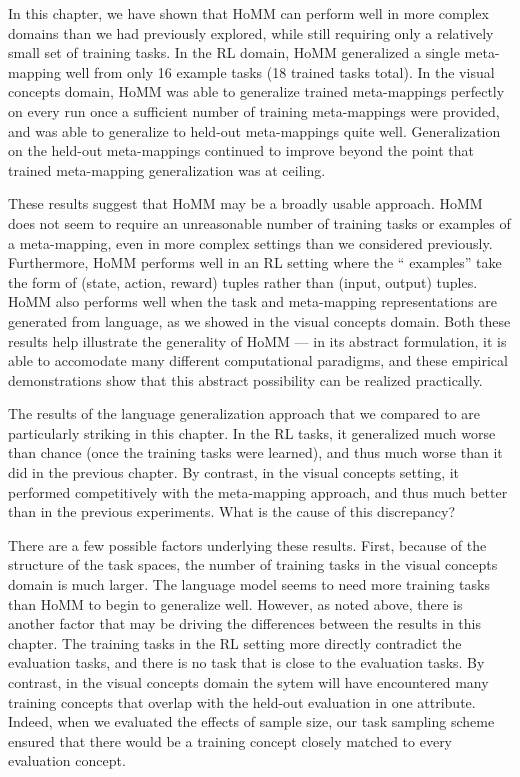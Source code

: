 In this chapter, we have shown that HoMM can perform well in more complex domains than we had previously explored, while still requiring only a relatively small set of training tasks. In the RL domain, HoMM generalized a single meta-mapping well from only 16 example tasks (18 trained tasks total). In the visual concepts domain, HoMM was able to generalize trained meta-mappings perfectly on every run once a sufficient number of training meta-mappings were provided, and was able to generalize to held-out meta-mappings quite well. Generalization on the held-out meta-mappings continued to improve beyond the point that trained meta-mapping generalization was at ceiling. \par 

These results suggest that HoMM may be a broadly usable approach. HoMM does not seem to require an unreasonable number of training tasks or examples of a meta-mapping, even in more complex settings than we considered previously. Furthermore, HoMM performs well in an RL setting where the `` examples'' take the form of (state, action, reward) tuples rather than (input, output) tuples. HoMM also performs well when the task and meta-mapping representations are generated from language, as we showed in the visual concepts domain. Both these results help illustrate the generality of HoMM --- in its abstract formulation, it is able to accomodate many different computational paradigms, and these empirical demonstrations show that this abstract possibility can be realized practically.\par  

The results of the language generalization approach that we compared to are particularly striking in this chapter. In the RL tasks, it generalized much worse than chance (once the training tasks were learned), and thus much worse than it did in the previous chapter. By contrast, in the visual concepts setting, it performed competitively with the meta-mapping approach, and thus much better than in the previous experiments. What is the cause of this discrepancy? \par 

There are a few possible factors underlying these results. First, because of the structure of the task spaces, the number of training tasks in the visual concepts domain is much larger. The language model seems to need more training tasks than HoMM to begin to generalize well. However, as noted above, there is another factor that may be driving the differences between the results in this chapter. The training tasks in the RL setting more directly contradict the evaluation tasks, and there is no task that is close to the evaluation tasks. By contrast, in the visual concepts domain the sytem will have encountered many training concepts that overlap with the held-out evaluation in one attribute. Indeed, when we evaluated the effects of sample size, our task sampling scheme ensured that there would be a training concept closely matched to every evaluation concept. \par

